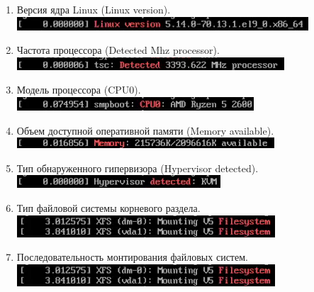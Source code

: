 \documentclass[12pt]{article}
\begin{document}
    \begin{enumerate}
      \item Версия ядра Linux (Linux version).
        \\\includegraphics{1.png}\\
      \item Частота процессора (Detected Mhz processor).
        \\\includegraphics{2.png}\\
      \item Модель процессора (CPU0).
        \\\includegraphics{3.png}\\
      \item Объем доступной оперативной памяти (Memory available).
        \\\includegraphics{4.png}\\
      \item Тип обнаруженного гипервизора (Hypervisor detected).
        \\\includegraphics{5.png}\\
      \item Тип файловой системы корневого раздела.
        \\\includegraphics{6.png}\\
      \item Последовательность монтирования файловых систем.
        \\\includegraphics{6.png}\\
    \end{enumerate}
\end{document}
